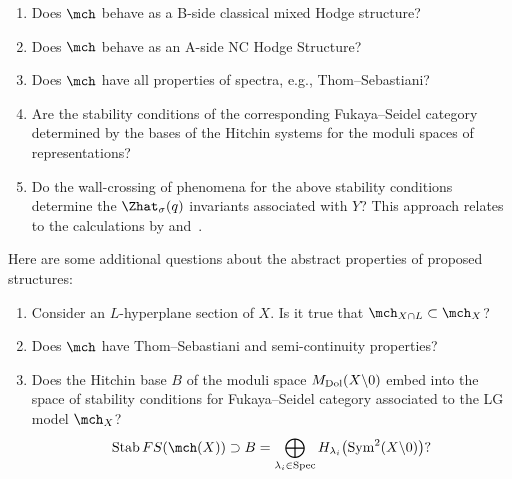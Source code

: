 \documentclass[10pt,a4paper]{amsart}
\begin{document}
\begin{Question}\quad
	\begin{enumerate}\itemsep=0pt
		\item[(1)] Does $\mch$ behave as a B-side classical mixed Hodge structure?
		\item[(2)] Does $\mch$ behave as an A-side NC Hodge Structure?
		\item[(3)] Does $\mch$ have all properties of spectra, e.g., Thom--Sebastiani?
		\item[(4)] Are the stability conditions of the corresponding Fukaya--Seidel category determined by the bases of the Hitchin systems for the moduli spaces of representations?
		\item[(5)] Do the wall-crossing of phenomena for the above stability conditions determine the $\Zhat_{\sigma} (q)$ invariants associated with $Y$? This approach relates to the calculations by \cite{EGGKPSS22,EGGKPS22} and~\cite{KS1}.
		\setcounter{questionsNCNA}{\value{enumi}}
	\end{enumerate}
\end{Question}
Here are some additional questions about the abstract properties of proposed structures:
\begin{enumerate}
	\setcounter{enumi}{\value{questionsNCNA}}\itemsep=0pt
	\item[(1)] Consider an $L$-hyperplane section of $X$. Is it true that $\mch_{X \cap L} \subset \mch_X$?
	\item[(2)] Does $\mch$ have Thom--Sebastiani and semi-continuity properties?
	\item[(3)] Does the Hitchin base $B$ of the moduli space $M_{\rm Dol}(X {\setminus} 0)$ embed into the space of stability conditions for Fukaya--Seidel category associated to the LG model $\mch_X$?
	\[
		\operatorname{Stab}\mathop{FS}(\mch(X)) \supset B = \bigoplus\limits_{\lambda_i \in {\rm Spec}} H_{\lambda_i}\bigl({\rm Sym}^2(X {\setminus} 0)\bigr)?
	\]
\end{enumerate}
\end{document}
